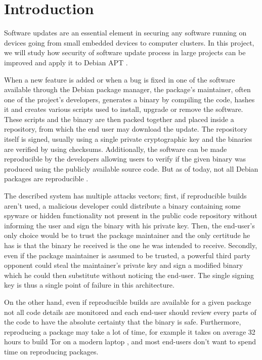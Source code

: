 \documentclass[11pt, upma4paper, twoside, openany, parskip=half]{book}
\begin{document}


\tableofcontents

\chapter{Introduction}
Software updates are an essential element in securing any software running on devices going from small embedded devices to computer clusters. In this project, we will study how security of software update process in large projects can be improved and apply it to Debian APT \cite{_apt_????}. 

When a new feature is added or when a bug is fixed in one of the software available through the Debian package manager, the package's maintainer, often one of the project's developers, generates a binary by compiling the code, hashes it and creates various scripts used to install, upgrade or remove the software. These scripts and the binary are then packed together and placed inside a repository, from which the end user may download the update. The repository itself is signed, usually using a single  private cryptographic key and the binaries are verified by using checksums. Additionally, the software can be made reproducible by the developers allowing users to verify if the given binary was produced using the publicly available source code. But as of today, not all Debian packages are reproducible \cite{_overview_????}.

The described system has multiple attacks vectors; first, if reproducible builds aren't used, a malicious developer could distribute a binary containing some spyware or hidden functionality not present in the public code repository without informing the user and sign the binary with his private key. Then, the end-user's only choice would be to trust the package maintainer and the only certitude he has is that the binary he received is the one he was intended to receive. Secondly, even if the package maintainer is assumed to be trusted, a powerful third party opponent could steal the maintainer's private key and sign a modified binary which he could then substitute without noticing the end-user. The single signing key is thus a single point of failure in this architecture.

On the other hand, even if reproducible builds are available for a given package not all code details are monitored and each end-user should review every parts of the code to have the absolute certainty that the binary is safe. Furthermore, reproducing a package may take a lot of time, for example it takes on average 32 hours to build Tor on a modern laptop \cite{_tor_????}, and most end-users don't want to spend time on reproducing packages.
\end{document}
